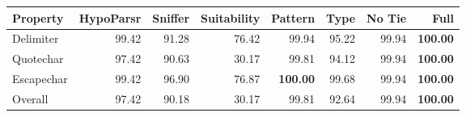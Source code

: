 \begin{tabular}{lrrr|rrrr}
Property & HypoParsr & Sniffer & Suitability & Pattern & Type & No Tie & Full\\
\hline
Delimiter & 99.42 & 91.28 & 76.42 & 99.94 & 95.22 & 99.94 & \textbf{100.00}\\
Quotechar & 97.42 & 90.63 & 30.17 & 99.81 & 94.12 & 99.94 & \textbf{100.00}\\
Escapechar & 99.42 & 96.90 & 76.87 & \textbf{100.00} & 99.68 & 99.94 & \textbf{100.00}\\
Overall & 97.42 & 90.18 & 30.17 & 99.81 & 92.64 & 99.94 & \textbf{100.00}\\
\hline
\end{tabular}